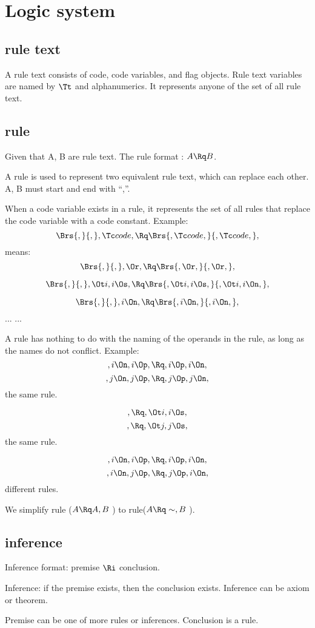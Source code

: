 \bigskip
\bigskip
\section{Logic system}
\subsection{rule text}
A rule text consists of code, code variables, and flag objects. Rule text variables are named by \( \Tt\) and alphanumerics. It represents anyone of the set of all rule text.


\subsection{rule}
Given that A, B are rule text. The rule format : \(  A \Rq B\).

A rule is used to represent two equivalent rule text, which can replace each other. A, B must start and end with “,”.

When a code variable exists in a rule, it represents the set of all rules that replace the code variable with a code constant. Example:
\[\Brs{,}{,}, \Tc code, \Rq \Brs{, \Tc code, }{, \Tc code, }, \] 
means:
\[\Brs{,}{,}, \Or, \Rq \Brs{, \Or, }{, \Or, }, \] 

\[\Brs{,}{,}, \Ot i, i \Os, \Rq \Brs{, \Ot i, i \Os, }{, \Ot i, i \On, }, \] 

\[\Brs{,}{,}, i \On, \Rq \Brs{, i \On, }{, i \On, }, \] 
... ...

A rule has nothing to do with the naming of the operands in the rule, as long as the names do not conflict.
	Example:
\[,i \On, i \Op, \Rq , i \Op, i \On, \]
\[,j \On, j \Op, \Rq , j \Op, j \On, \]
the same rule.

\[, \Rq , \Ot i, i \Os, \]
\[, \Rq , \Ot j, j \Os, \]
the same rule.

\[,i \On, i \Op, \Rq , i \Op, i \On, \]
\[,i \On, j \Op, \Rq , j \Op, i \On, \]
different rules.

We simplify rule (\(  A \Rq A,B \) ) to rule(\(  A \Rq \sim,B \) ).

\subsection{inference}
Inference format: premise \( \Ri \) conclusion.

Inference: if the premise exists, then the conclusion exists. Inference can be axiom or theorem.

Premise can be one of more rules or inferences. Conclusion is a rule.

